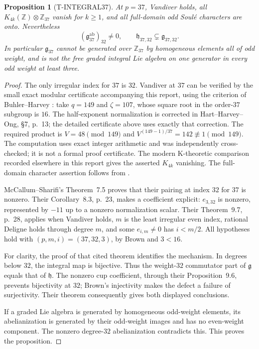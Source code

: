 \documentclass[11pt,a4paper]{article}
\newtheorem{proposition}[theorem]{Proposition}
\theoremstyle{definition}
\begin{document}
\begin{proposition}[T-INTEGRAL37]\label{prop:37-counterexample}
At $p=37$, Vandiver holds, all $K_{4k}(\mathbb Z)\otimes\mathbb Z_{37}$ vanish for $k\geq1$, and all full-domain odd Soul\'e characters are onto. Nevertheless
\[
 (\mathfrak g_{37}^{\mathrm{ab}})_{32}\neq0,
 \qquad
 \mathfrak h_{37,32}\subsetneq\mathfrak g_{37,32}.
\]
In particular $\mathfrak g_{37}$ cannot be generated over $\mathbb Z_{37}$ by homogeneous elements all of odd weight, and is not the free graded integral Lie algebra on one generator in every odd weight at least three.
\end{proposition}

\begin{proof}
The only irregular index for $37$ is $32$. Vandiver at $37$ can be verified by the small exact modular certificate accompanying this report, using the criterion of Buhler--Harvey \cite[\S4, pp.~4--5]{BuhlerHarvey2011}: take $q=149$ and $\zeta=107$, whose square root in the order-$37$ subgroup is $16$. The half-exponent normalization is corrected in Hart--Harvey--Ong, \S7, p.~13; the detailed certificate above uses exactly that correction. The required product is $V=48\pmod{149}$ and $V^{(149-1)/37}=142\not\equiv1\pmod{149}$. The computation uses exact integer arithmetic and was independently cross-checked; it is not a formal proof certificate. The modern K-theoretic comparison recorded elsewhere in this report gives the asserted $K_{4k}$ vanishing. The full-domain character assertion follows from \cite[Theorem~1.1(3)]{IshiiKummer2024}.

McCallum--Sharifi's Theorem~7.5 proves that their pairing at index $32$ for $37$ is nonzero. Their Corollary~8.3, p.~23, makes a coefficient explicit: $e_{3,32}$ is nonzero, represented by $-11$ up to a nonzero normalization scalar. Their Theorem~9.7, p.~28, applies when Vandiver holds, $m$ is the least irregular even index, rational Deligne holds through degree $m$, and some $e_{i,m}\neq0$ has $i<m/2$. All hypotheses hold with $(p,m,i)=(37,32,3)$, by Brown and $3<16$.

For clarity, the proof of that cited theorem identifies the mechanism. In degrees below $32$, the integral map is bijective. Thus the weight-$32$ commutator part of $\mathfrak g$ equals that of $\mathfrak h$. The nonzero cup coefficient, through their Proposition~9.6, prevents bijectivity at $32$; Brown's injectivity makes the defect a failure of surjectivity. Their theorem consequently gives both displayed conclusions.

If a graded Lie algebra is generated by homogeneous odd-weight elements, its abelianization is generated by their odd-weight images and has no even-weight component. The nonzero degree-$32$ abelianization contradicts this. This proves the proposition.
\end{proof}
\end{document}
